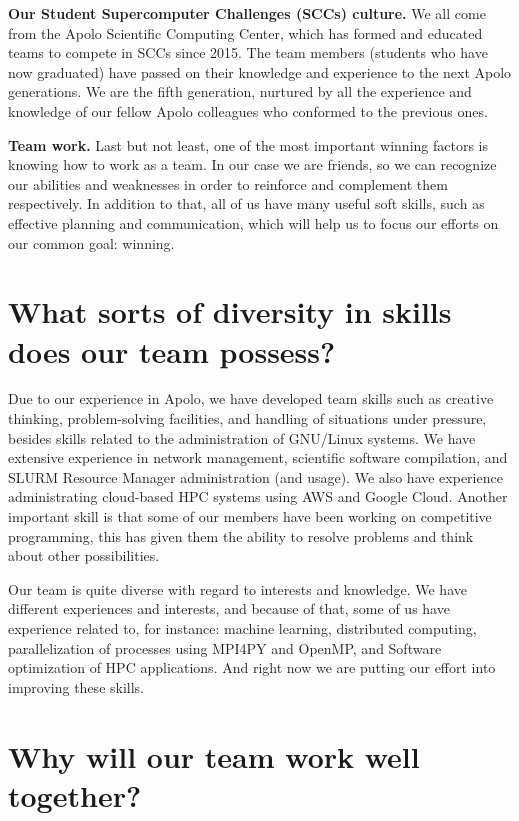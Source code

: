 \documentclass[11pt,a4paper,twocolumn]{article}
\begin{document}
\textbf{Our Student Supercomputer Challenges (SCCs) culture.} We all come from the Apolo Scientific Computing Center, which has formed and educated teams to compete in SCCs since 2015. The team members (students who have now graduated) have passed on their knowledge and experience to the next Apolo generations. We are the fifth generation, nurtured by all the experience and knowledge of our fellow Apolo colleagues who conformed to the previous ones.

\textbf{Team work.} Last but not least, one of the most important winning factors is knowing how to work as a team. In our case we are friends, so we can recognize our abilities and weaknesses in order to reinforce and complement them respectively. In addition to that, all of us have many useful soft skills, such as effective planning and communication, which will help us to focus our efforts on our common goal: winning.

\section{What sorts of diversity in skills does our team possess?}

Due to our experience in Apolo, we have developed team skills such as creative thinking, problem-solving facilities, and handling of situations under pressure, besides skills related to the administration of GNU/Linux systems. We have extensive experience in network management, scientific software compilation, and SLURM Resource Manager administration (and usage). We also have experience administrating cloud-based HPC systems using AWS and Google Cloud. Another important skill is that some of our members have been working on competitive programming, this has given them the ability to resolve problems and think about other possibilities.

Our team is quite diverse with regard to interests and knowledge. We have different experiences and interests, and because of that, some of us have experience related to, for instance: machine learning, distributed computing, parallelization of processes using MPI4PY and OpenMP, and Software optimization of HPC applications. And right now we are putting our effort into improving these skills.

\section{Why will our team work well together?}
\end{document}
